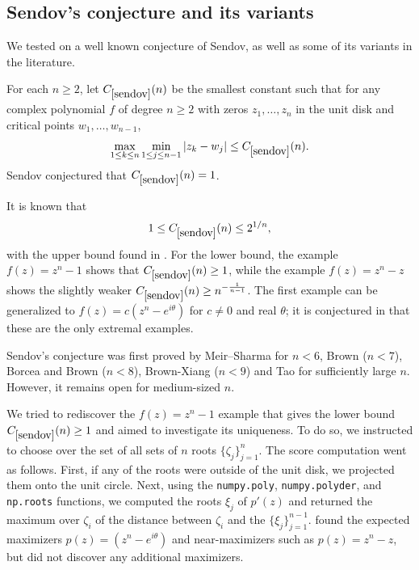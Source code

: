 \subsection{Sendov's conjecture and its variants}

We tested \AlphaEvolve on a well known conjecture of Sendov, as well as some of its variants in the literature.

\renewcommand{\problemURL}{https://google-deepmind.github.io/alphaevolve_repository_of_problems/problems/20.html}

\begin{problem}\label{sendov}
    For each $n \geq 2$, let $C_{\ref{sendov}}(n)$ be the smallest constant such that for any complex polynomial $f$ of degree $n \ge 2$ with zeros $z_1, \dots, z_n$ in the unit disk and critical points $w_1, \dots, w_{n-1}$,
$$
\max_{1 \le k \le n} \min_{1 \le j \le n-1} |z_k - w_j| \le C_{\ref{sendov}}(n).
$$
Sendov \cite{sendov} conjectured that $C_{\ref{sendov}}(n)=1$.
\end{problem}


It is known that
$$ 1 \leq C_{\ref{sendov}}(n) \leq 2^{1/n},$$
with the upper bound found in \cite{brs}.  For the lower bound, the example $f(z)=z^n-1$ shows that $C_{\ref{sendov}}(n) \geq 1$, while the example $f(z) = z^n-z$ shows the slightly weaker $C_{\ref{sendov}}(n) \geq n^{-\frac{1}{n-1}}$.  The first example can be generalized to $f(z) = c (z^n- e^{i\theta})$ for $c \neq 0$ and real $\theta$; it is conjectured in \cite{phelps} that these are the only extremal examples.

 Sendov's conjecture was first proved by Meir--Sharma \cite{meir1969} for $n < 6$, Brown \cite{brown1991} ($n < 7$), Borcea \cite{borcea1996} and Brown \cite{brown1997} ($n < 8$), Brown-Xiang \cite{brown-xiang} ($n<9$) and Tao \cite{tao-sendov} for sufficiently large $n$.  However, it remains open for medium-sized $n$.


We tried to rediscover the $f(z)=z^n-1$ example that gives the lower bound $C_{\ref{sendov}}(n) \geq 1$ and aimed to investigate its uniqueness. To do so, we instructed \AlphaEvolve to choose over the set of all sets of $n$ roots $\{\zeta_j\}_{j=1}^{n}$. The score computation went as follows. First, if any of the roots were outside of the unit disk, we projected them onto the unit circle. Next, using the \texttt{numpy.poly}, \texttt{numpy.polyder}, and \texttt{np.roots} functions, we computed  the roots $\xi_j$ of $p'(z)$ and returned the maximum over $\zeta_i$ of the distance between $\zeta_i$ and the $\{\xi_j\}_{j=1}^{n-1}$. \AlphaEvolve found the expected maximizers $p(z) = (z^n - e^{i \theta})$ and near-maximizers such as $p(z)=z^n-z$, but did not discover any additional maximizers.

